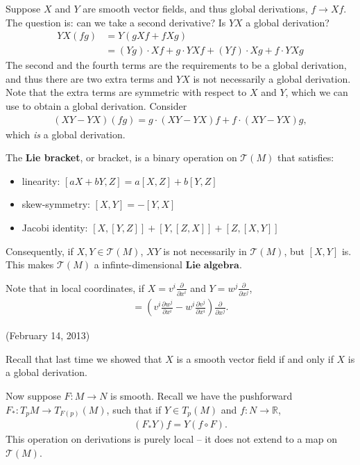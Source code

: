 \documentclass{../mathnotes}
\begin{document}
Suppose $X$ and $Y$ are smooth vector fields, and thus global derivations, $f\to Xf$. The question is: can we take a second derivative?
Is $YX$ a global derivation? 
\begin{align*}
    YX(fg)&=Y(gXf+fXg)\\
    &=(Yg)\cdot Xf+g\cdot YXf+(Yf)\cdot Xg+f\cdot YXg
\end{align*}
The second and the fourth terms are the requirements to be a global derivation, and thus there are two extra terms and $YX$ is not necessarily
a global derivation. Note that the extra terms are symmetric with respect to $X$ and $Y$, which we can use to obtain a global derivation. Consider
\begin{align*}
    (XY-YX)(fg)=g\cdot(XY-YX)f+f\cdot (XY-YX)g,
\end{align*}
which \textit{is} a global derivation.
\begin{defn}
    The \textbf{Lie bracket}, or bracket, is a binary operation on $\mathcal{T}(M)$ that satisfies:
    \begin{itemize}
        \item linearity: $[aX+bY,Z]=a[X,Z]+b[Y,Z]$
        \item skew-symmetry: $[X,Y]=-[Y,X]$
        \item Jacobi identity: $[X,[Y,Z]]+[Y,[Z,X]]+[Z,[X,Y]]$
    \end{itemize}
\end{defn}

Consequently, if $X,Y\in\mathcal{T}(M)$, $XY$ is not necessarily in $\mathcal{T}(M)$, but $[X,Y]$ is. This makes $\mathcal{T}(M)$ a infinte-dimensional
$\textbf{Lie algebra}$.

Note that in local coordinates, if $X=v^i\frac{\partial}{\partial x^i}$ and $Y=w^j\frac{\partial}{\partial x^j}$,
\begin{align*}
    [X,Y]=\left( v^i\frac{\partial w^j}{\partial x^i}-w^i\frac{\partial v^j}{\partial x^i}\right)\frac{\partial}{\partial x^j}.
\end{align*}



(February 14, 2013)

Recall that last time we showed that $X$ is a smooth vector field if and only if $X$ is a global derivation.

Now suppose $F:M\to N$ is smooth. Recall we have the pushforward $F_*:T_pM\to T_{F(p)}(M)$, such that if $Y\in T_p(M)$ and $f:N\to\mathbb{R}$,
\begin{align*}
    (F_*Y)f=Y(f\circ F).
\end{align*}
This operation on derivations is purely local -- it does not extend to a map on $\mathcal{T}(M)$.
\end{document}
